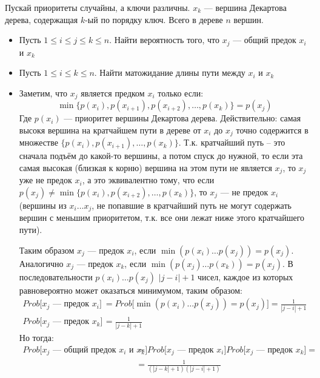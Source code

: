 \begin{task}[4]
Пускай приоритеты случайны, а ключи различны. $x_k$ --- вершина Декартова дерева, содержащая $k$-ый по порядку ключ. Всего в дереве $n$ вершин.
\begin{itemize}
	\item Пусть $1 \leqslant i \leqslant j \leqslant k \leqslant n$. Найти вероятность того, что $x_j$  --- общий предок $x_i$ и $x_k$
	\item Пусть $1 \leqslant i \leqslant k \leqslant n$. Найти матожидание длины пути между $x_i$ и $x_k$
\end{itemize}
\end{task}
\begin{solution}
\begin{itemize}
\item Заметим, что $x_j$ является предком $x_i$ только если:
\[ \min{\lbrace p(x_i), p(x_{i+1}), p(x_{i+2}), \ldots, p(x_k) \rbrace} = p(x_j) \]
Где $p(x_i)$ --- приоритет вершины Декартова дерева. Действительно: самая высокя вершина на кратчайшем пути в дереве от $x_i$ до $x_j$ точно содержится в множестве $\lbrace p(x_i), p(x_{i+1}), \ldots, p(x_k) \rbrace$. Т.к. кратчайший путь -- это сначала подъём до какой-то вершины, а потом спуск до нужной, то если эта самая высокая (близкая к корню) вершина на этом пути не является $x_j$, то $x_j$ уже не предок $x_i$, а это эквивалентно тому, что если $p(x_j) \neq \min{\lbrace p(x_i), p(x_{i+2}), \ldots, p(x_k) \rbrace}$, то $x_j$ --- не предок $x_i$ (вершины из $x_i\ldots x_j$, не попавшие в кратчайший путь не могут содержать вершин с меньшим приоритетом, т.к. все они лежат ниже этого кратчайшего пути).

Таким образом $x_j$ --- предок $x_i$, если $\min{(p(x_i)\ldots p(x_j)) = p(x_j)}$. Аналогично $x_j$ --- предок $x_k$, если $\min{(p(x_j)\ldots p(x_k)) = p(x_j)}$. В последовательности $p(x_i)\ldots p(x_j)$ $|j - i| + 1$ чисел, каждое из которых равновероятно может оказаться минимумом, таким образом:
\begin{align*}
	Prob\big[ x_j \text{ --- предок } x_i \big] & = Prob\big[\min{(p(x_i)\ldots p(x_j)) = p(x_j)}\big] = \frac{1}{|j - i| + 1} \\
	Prob\big[ x_j \text{ --- предок } x_k \big] &= \frac{1}{|j - k| + 1}
\end{align*}
Но тогда:
\begin{align*}
	Prob\big[ x_j \text{ --- общий предок } x_i \text{ и } x_k\big] &=  Prob\big[ x_j \text{ --- предок } x_i \big]Prob\big[ x_j \text{ --- предок } x_k \big] = \\ 
	& = \frac{1}{(|j - k| + 1)(|j - i| + 1)}
\end{align*}


\end{itemize}
\end{solution}
